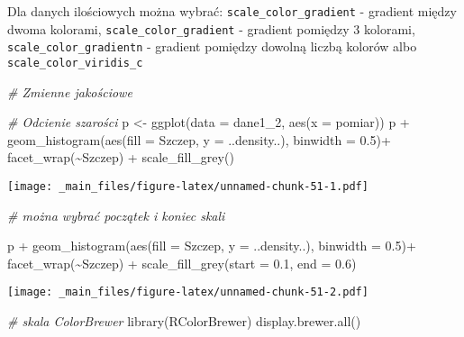 \documentclass[
]{book}
\newenvironment{Shaded}{\begin{snugshade}}{\end{snugshade}}
\newcommand{\AttributeTok}[1]{\textcolor[rgb]{0.77,0.63,0.00}{#1}}
\newcommand{\CommentTok}[1]{\textcolor[rgb]{0.56,0.35,0.01}{\textit{#1}}}
\newcommand{\FloatTok}[1]{\textcolor[rgb]{0.00,0.00,0.81}{#1}}
\newcommand{\FunctionTok}[1]{\textcolor[rgb]{0.00,0.00,0.00}{#1}}
\newcommand{\NormalTok}[1]{#1}
\newcommand{\OtherTok}[1]{\textcolor[rgb]{0.56,0.35,0.01}{#1}}
\newcommand{\SpecialCharTok}[1]{\textcolor[rgb]{0.00,0.00,0.00}{#1}}
\begin{document}
Dla danych ilościowych można wybrać: \texttt{scale\_color\_gradient} - gradient między dwoma kolorami, \texttt{scale\_color\_gradient} - gradient pomiędzy 3 kolorami, \texttt{scale\_color\_gradientn} - gradient pomiędzy dowolną liczbą kolorów albo \texttt{scale\_color\_viridis\_c}

\begin{Shaded}
\begin{Highlighting}[]
\CommentTok{\# Zmienne jakościowe}

\CommentTok{\# Odcienie szarości}
\NormalTok{p }\OtherTok{\textless{}{-}} \FunctionTok{ggplot}\NormalTok{(}\AttributeTok{data =}\NormalTok{ dane1\_2, }\FunctionTok{aes}\NormalTok{(}\AttributeTok{x =}\NormalTok{ pomiar))}
\NormalTok{p }\SpecialCharTok{+} \FunctionTok{geom\_histogram}\NormalTok{(}\FunctionTok{aes}\NormalTok{(}\AttributeTok{fill =}\NormalTok{ Szczep, }\AttributeTok{y =}\NormalTok{ ..density..), }\AttributeTok{binwidth =} \FloatTok{0.5}\NormalTok{)}\SpecialCharTok{+}
  \FunctionTok{facet\_wrap}\NormalTok{(}\SpecialCharTok{\textasciitilde{}}\NormalTok{Szczep) }\SpecialCharTok{+} \FunctionTok{scale\_fill\_grey}\NormalTok{()}
\end{Highlighting}
\end{Shaded}

\texttt{[image: \_main\_files/figure-latex/unnamed-chunk-51-1.pdf]}

\begin{Shaded}
\begin{Highlighting}[]
\CommentTok{\# można wybrać początek i koniec skali}

\NormalTok{p }\SpecialCharTok{+} \FunctionTok{geom\_histogram}\NormalTok{(}\FunctionTok{aes}\NormalTok{(}\AttributeTok{fill =}\NormalTok{ Szczep, }\AttributeTok{y =}\NormalTok{ ..density..), }\AttributeTok{binwidth =} \FloatTok{0.5}\NormalTok{)}\SpecialCharTok{+}
  \FunctionTok{facet\_wrap}\NormalTok{(}\SpecialCharTok{\textasciitilde{}}\NormalTok{Szczep) }\SpecialCharTok{+} \FunctionTok{scale\_fill\_grey}\NormalTok{(}\AttributeTok{start =} \FloatTok{0.1}\NormalTok{, }\AttributeTok{end =} \FloatTok{0.6}\NormalTok{)}
\end{Highlighting}
\end{Shaded}

\texttt{[image: \_main\_files/figure-latex/unnamed-chunk-51-2.pdf]}

\begin{Shaded}
\begin{Highlighting}[]
\CommentTok{\# skala ColorBrewer}
\FunctionTok{library}\NormalTok{(RColorBrewer)}
\FunctionTok{display.brewer.all}\NormalTok{()}
\end{Highlighting}
\end{Shaded}
\end{document}
